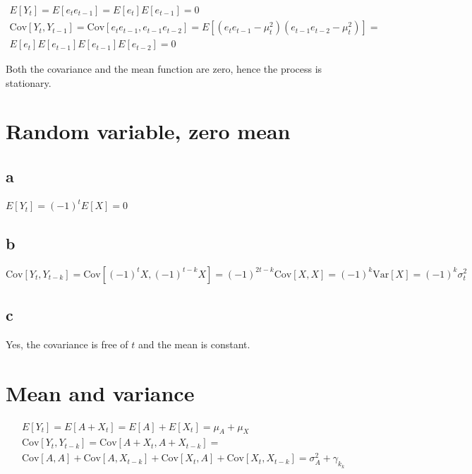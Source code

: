 \documentclass[]{book}
\begin{document}
\begin{gather*}
  E[Y_t] = E[e_t e_{t-1}] = E[e_t] E[e_{t-1}] = 0\\
  \text{Cov}[Y_t, Y_{t-1}] = \text{Cov}[e_t e_{t-1}, e_{t-1} e_{t-2}] = E[(e_t e_{t-1} - \mu_t^2)(e_{t-1} e_{t-2} - \mu_t^2)] =\\
  E[e_t]E[e_{t-1}]E[e_{t-1}]E[e_{t-2}] = 0
\end{gather*}

Both the covariance and the mean function are zero, hence the process is
stationary.

\section{Random variable, zero mean}\label{random-variable-zero-mean}

\subsection*{a}\label{a-11}

\(E[Y_t] = (-1)^tE[X] = 0\)

\subsection*{b}\label{b-11}

\(\text{Cov}[Y_t, Y_{t-k}] = \text{Cov}[(-1)^tX, (-1)^{t-k}X] = (-1)^{2t-k}\text{Cov}[X, X] = (-1)^k \text{Var}[X] = (-1)^k\sigma_t^2\)

\subsection*{c}\label{c-5}

Yes, the covariance is free of \(t\) and the mean is constant.

\section{Mean and variance}\label{mean-and-variance}

\begin{gather*}
  E[Y_t] = E[A + X_t] = E[A] + E[X_t] = \mu_A + \mu_X\\
  \text{Cov}[Y_t, Y_{t-k}] = \text{Cov}[A + X_t, A+ X_{t-k}] = \\
  \text{Cov}[A, A] + \text{Cov}[A, X_{t-k}] + \text{Cov}[X_t, A] + \text{Cov}[X_t, X_{t-k}] = \sigma_A^2 + \gamma_{k_k}
\end{gather*}
\end{document}
